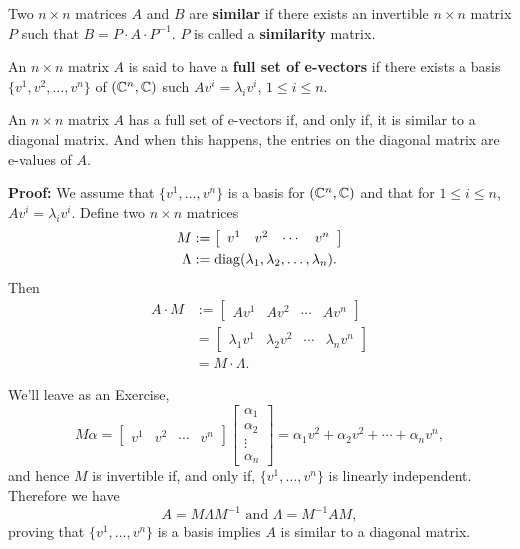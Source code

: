 \begin{definition}
Two $n \times n$ matrices $A$ and $B$ are \textbf{similar} if there exists an invertible $n \times n$ matrix $P$ such that $B=P \cdot A \cdot P^{-1}$. $P$ is called a \textbf{similarity} matrix. 
\end{definition}

\begin{definition}
An $n \times n$ matrix $A$ is said to have a \textbf{full set of e-vectors} if there exists a basis $\{ v^1, v^2, \ldots, v^n\}$ of $(\mathbb C^n, \mathbb C)$ such $A v^i = \lambda_i v^i$, $1 \le i \le n$.
\end{definition}

\begin{thm}
\label{thm:SimilarDiagnonalMatrix}
An $n \times n$ matrix $A$ has a full set of e-vectors if, and only if, it is similar to a diagonal matrix. And when this happens, the entries on the diagonal matrix are e-values of $A$.
\end{thm} 

\textbf{Proof:} We assume that $\{ v^1, \ldots, v^n \}$ is a basis for $(\mathbb C^n, \mathbb C)$ and that for $1 \le i \le n$, $A v^i = \lambda_i v^i$. Define two $n \times n$ matrices
\begin{align*}
    M &:= \left[ \begin{array}{cccc} v^1 & v^2 & \cdots & v^n \end{array} \right] \\
    \Lambda &:= {\rm diag}(\lambda_1, \lambda_2, \ldots, \lambda_n).
\end{align*}
Then 
\begin{align*}
   A \cdot M &:= \left[ \begin{array}{cccc} A v^1 & A v^2 & \cdots & A v^n \end{array} \right] \\
   &=\left[ \begin{array}{cccc} \lambda_1 v^1 & \lambda_2 v^2 & \cdots & \lambda_n v^n \end{array} \right] \\
  &= M \cdot \Lambda.
\end{align*}
 
 We'll leave as an Exercise, 
 $$ M  \alpha = \left[ \begin{array}{cccc} v^1 & v^2 & \cdots & v^n \end{array} \right]  \begin{bmatrix}\alpha_{1}\\
            \alpha_{2}\\
            \vdots\\
            \alpha_{n}
        \end{bmatrix} = \alpha_1 v^2 + \alpha_2 v^2 + \cdots + \alpha_n v^n,$$
        and hence $M$ is invertible if, and only if, $\{ v^1, \ldots, v^n \}$ is linearly independent. Therefore we have 
        $$A = M \Lambda M^{-1} \text{ and } \Lambda = M^{-1} A M, $$
        proving that  $\{ v^1, \ldots, v^n \}$ is a basis implies $A$ is similar to a diagonal matrix. \\
        
